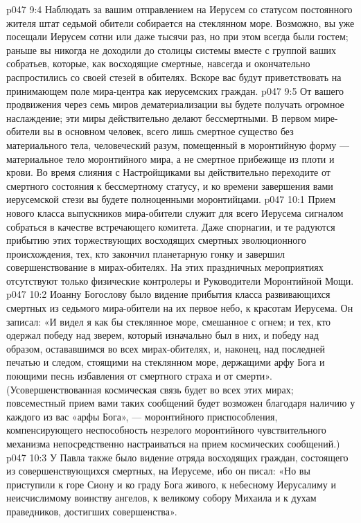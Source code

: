\vs p047 9:4 Наблюдать за вашим отправлением на Иерусем со статусом постоянного жителя штат седьмой обители собирается на стеклянном море. Возможно, вы уже посещали Иерусем сотни или даже тысячи раз, но при этом всегда были гостем; раньше вы никогда не доходили до столицы системы вместе с группой ваших собратьев, которые, как восходящие смертные, навсегда и окончательно распростились со своей стезей в обителях. Вскоре вас будут приветствовать на принимающем поле мира\hyp{}центра как иерусемских граждан.
\vs p047 9:5 \pc От вашего продвижения через семь миров дематериализации вы будете получать огромное наслаждение; эти миры действительно делают бессмертными. В первом мире\hyp{}обители вы в основном человек, всего лишь смертное существо без материального тела, человеческий разум, помещенный в моронтийную форму --- материальное тело моронтийного мира, а не смертное прибежище из плоти и крови. Во время слияния с Настройщиками вы действительно переходите от смертного состояния к бессмертному статусу, и ко времени завершения вами иерусемской стези вы будете полноценными моронтийцами.
\vs p047 10:1 Прием нового класса выпускников мира\hyp{}обители служит для всего Иерусема сигналом собраться в качестве встречающего комитета. Даже спорнагии, и те радуются прибытию этих торжествующих восходящих смертных эволюционного происхождения, тех, кто закончил планетарную гонку и завершил совершенствование в мирах\hyp{}обителях. На этих праздничных мероприятиях отсутствуют только физические контролеры и Руководители Моронтийной Мощи.
\vs p047 10:2 \pc Иоанну Богослову было видение прибытия класса развивающихся смертных из седьмого мира\hyp{}обители на их первое небо, к красотам Иерусема. Он записал: «И видел я как бы стеклянное море, смешанное с огнем; и тех, кто одержал победу над зверем, который изначально был в них, и победу над образом, остававшимся во всех мирах\hyp{}обителях, и, наконец, над последней печатью и следом, стоящими на стеклянном море, держащими арфу Бога и поющими песнь избавления от смертного страха и от смерти». (Усовершенствованная космическая связь будет во всех этих мирах; повсеместный прием вами таких сообщений будет возможен благодаря наличию у каждого из вас «арфы Бога», --- моронтийного приспособления, компенсирующего неспособность незрелого моронтийного чувствительного механизма непосредственно настраиваться на прием космических сообщений.)
\vs p047 10:3 У Павла также было видение отряда восходящих граждан, состоящего из совершенствующихся смертных, на Иерусеме, ибо он писал: «Но вы приступили к горе Сиону и ко граду Бога живого, к небесному Иерусалиму и неисчислимому воинству ангелов, к великому собору Михаила и к духам праведников, достигших совершенства».
